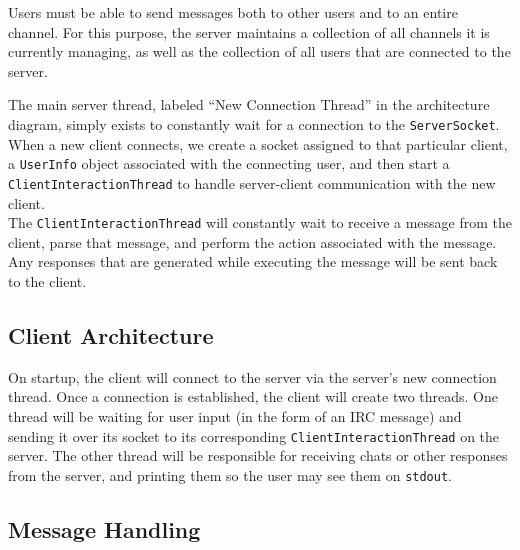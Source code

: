 \documentclass{article}
\begin{document}
Users must be able to send messages both to other users and to an entire channel.
For this purpose, the server maintains a collection of all channels it is currently
managing, as well as the collection of all users that are connected to the server.

The main server thread, labeled ``New Connection Thread'' in the architecture diagram,
simply exists to constantly wait for a connection to the \texttt{ServerSocket}.  When
a new client connects, we create a socket assigned to that particular client, a \texttt{UserInfo}
object associated with the connecting user, and then start a \texttt{ClientInteractionThread}
to handle server-client communication with the new client.
\\

The \texttt{ClientInteractionThread} will constantly wait to receive a message from
the client, parse that message, and perform the action associated with the message.
Any responses that are generated while executing the message will be sent back to
the client.

\subsection{Client Architecture}

On startup, the client will connect to the server via the server's new connection thread.
Once a connection is established, the client will
create two threads.  One thread will be waiting for user input (in the form of an IRC message)
and sending it over its socket to its corresponding \texttt{ClientInteractionThread} on the server.
The other thread will be responsible for receiving chats or other responses from the server, and printing
them so the user may see them on \texttt{stdout}.

\subsection{Message Handling}
\end{document}
